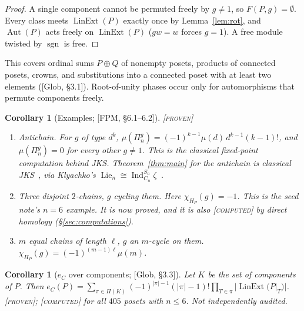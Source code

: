 \documentclass[11pt]{article}
\newtheorem{corollary}[theorem]{Corollary}
\theoremstyle{definition}
\theoremstyle{remark}
\newcommand{\Lin}{\operatorname{LinExt}}
\newcommand{\Aut}{\operatorname{Aut}}
\newcommand{\Lie}{\operatorname{Lie}}
\newcommand{\sgn}{\operatorname{sgn}}
\newcommand{\Ind}{\operatorname{Ind}}
\newcommand{\st}[1]{\textup{[\textsc{#1}]}}
\begin{document}
\begin{proof}
A single component cannot be permuted freely by $g\ne1$, so
$F(P,g)=\emptyset$. Every class meets $\Lin(P)$ exactly once by
Lemma~\ref{lem:rot}, and $\Aut(P)$ acts freely on $\Lin(P)$ ($gw=w$ forces
$g=1$). A free module twisted by $\sgn$ is free.
\end{proof}

This covers ordinal sums $P\oplus Q$ of nonempty posets, products of
connected posets, crowns, and substitutions into a connected poset with at
least two elements ([Glob, \S3.1]). Root-of-unity phases occur only for
automorphisms that permute components freely.

\begin{corollary}[Examples; {[FPM, \S6.1--6.2]}]\label{cor:examples}
\st{proven}
\begin{enumerate}[label=(\alph*)]
\item \emph{Antichain.} For $g$ of type $d^k$,
  $\mu(\Pi_n^g)=(-1)^{k-1}\mu(d)\,d^{k-1}(k-1)!$, and $\mu(\Pi_n^g)=0$ for
  every other $g\ne1$. This is the classical fixed-point computation behind
  JKS. Theorem~\ref{thm:main} for the antichain is classical
  JKS~\cite{Stanley82,Hanlon81,Joyal86}, via Klyachko's
  $\Lie_n\cong\Ind_{C_n}^{S_n}\zeta$~\cite{Klyachko}.
\item \emph{Three disjoint $2$-chains, $g$ cycling them.} Here
  $\chi_{H_P}(g)=-1$. This is the seed note's $n=6$ example. It is now
  proved, and it is also \st{computed} by direct homology
  (\S\ref{sec:computations}).
\item \emph{$m$ equal chains of length $\ell$, $g$ an $m$-cycle on them.}
  $\chi_{H_P}(g)=(-1)^{(m-1)\ell}\mu(m)$.
\end{enumerate}
\end{corollary}

\begin{corollary}[$e_C$ over components; {[Glob, \S3.3]}]\label{cor:eC}
Let $K$ be the set of components of $P$. Then
$e_C(P)=\sum_{\pi\in\Pi(K)}(-1)^{|\pi|-1}(|\pi|-1)!\prod_{T\in\pi}|\Lin(P|_T)|$.
\st{proven}; \st{computed} for all $405$ posets with $n\le6$. Not
independently audited.
\end{corollary}
\end{document}
